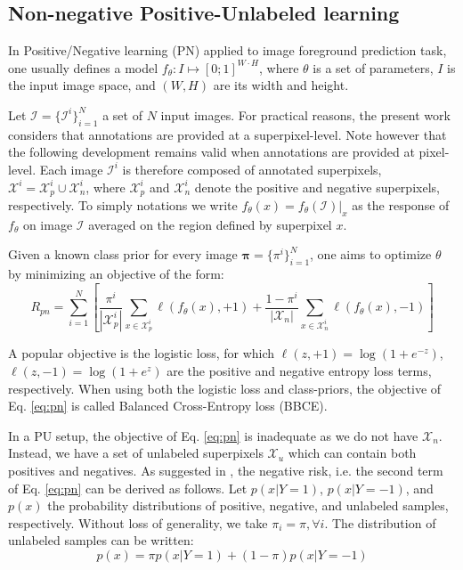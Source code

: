 
\subsection{Non-negative Positive-Unlabeled learning}
\label{sec:nnpu}

In Positive/Negative learning (PN) applied to image foreground prediction task,
one usually defines a model \(f_{\theta}: I \mapsto [0;1]^{W \cdot H}\), where \(\theta\) is a set of parameters, \(I\) is the input image space, and $(W,H)$ are its width and height.

Let \(\bm{\mathcal{I}} = \{\mathcal{I}^i\}_{i=1}^{N}\) a set of $N$ input images.
For practical reasons, the present work considers that annotations are provided at a superpixel-level.
Note however that the following development remains valid when annotations are provided at pixel-level.
Each image $\mathcal{I}^i$ is therefore composed of annotated superpixels, $\mathcal{X}^i=\mathcal{X}_p^i \cup \mathcal{X}_n^i$, where $\mathcal{X}_p^i$ and $\mathcal{X}_n^i$ denote the positive and negative superpixels, respectively.
To simply notations we write $f_{\theta}(x) = f_{\theta}(\mathcal{I})\big|_x$ as the
response of $f_{\theta}$ on image $\mathcal{I}$ averaged on the region defined by superpixel $x$.

Given a known class prior for every image $\bm{\pi} = \{\pi^i\}_{i=1}^{N}$, one aims to optimize $\theta$ by minimizing an objective of the form:
\begin{equation}
  \label{eq:pn}
R_{pn}=\sum_{i=1}^{N} \left[ \frac{\pi^i}{|\mathcal{X}_p^i|}\sum_{x \in \mathcal{X}_p^i}\ell(f_{\theta}(x),+1) +
\frac{1-\pi^i}{|\mathcal{X}_n|}\sum_{x \in \mathcal{X}_n^i}\ell(f_{\theta}(x),-1) \right]
\end{equation}

A popular objective is the logistic loss, for which \(\ell(z,+1)=\log(1+ e^{-z})\), \(\ell(z, -1)=\log(1+e^{z})\) are the positive and negative entropy loss terms, respectively.
When using both the logistic loss and class-priors, the objective of Eq. \ref{eq:pn} is called Balanced Cross-Entropy loss (BBCE).

In a PU setup, the objective of Eq. \ref{eq:pn} is inadequate as we do not have $\bm{\mathcal{X}}_{n}$.
Instead, we have a set of unlabeled superpixels $\bm{\mathcal{X}}_{u}$ which can contain both positives and negatives.
As suggested in \cite{duplessis15}, the negative risk, i.e. the second term of Eq. \ref{eq:pn} can be derived as follows.
Let \(p(x|Y=1)\), \(p(x|Y=-1)\), and $p(x)$ the probability distributions of positive, negative, and unlabeled samples, respectively.
Without loss of generality, we take $\pi_{i}=\pi, \forall i$.
The distribution of unlabeled samples can be written:
\begin{equation}
  \label{eq:probas}
   p(x) = \pi p(x|Y=1) + (1-\pi) p(x|Y=-1)
\end{equation}

